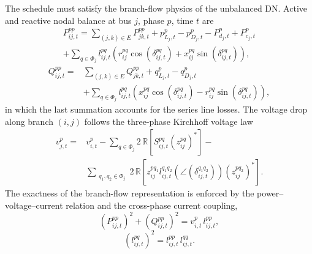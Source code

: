 The schedule must satisfy the branch-flow physics of the unbalanced DN.
Active and reactive nodal balance at bus $j$, phase $p$, time $t$ are
\begin{equation}\label{eq2}
\begin{split}
P_{ij,t}^{pp}
= \sum_{(j,k)\in E} P_{jk,t}^{pp} + p_{L_j,t}^p
- p_{D_j,t}^p - P_{d_j,t}^p + P_{c_j,t}^p \\ + \sum_{q \in \Phi_j} l_{ij,t}^{pq}
\left( r_{ij}^{pq} \cos(\delta_{ij,t}^{pq}) + x_{ij}^{pq} \sin(\delta_{ij,t}^{pq}) \right),
\end{split}
\end{equation}
\begin{equation}\label{eq3}
\begin{split}
Q_{ij,t}^{pp}
= & \sum_{(j,k)\in E} Q_{jk,t}^{pp} + q_{L_j,t}^p - q_{D_j,t}^p \\
& + \sum_{q \in \Phi_j} l_{ij,t}^{pq}
\left( x_{ij}^{pq} \cos(\delta_{ij,t}^{pq}) - r_{ij}^{pq} \sin(\delta_{ij,t}^{pq}) \right),
\end{split}
\end{equation}
in which the last summation accounts for the series line losses. The
voltage drop along branch $(i,j)$ follows the three-phase Kirchhoff
voltage law
\begin{equation}\label{eq4}
\begin{split}
v_{j,t}^p =  & v_{i,t}^p
- \sum_{q \in \Phi_j} 2\,\mathbb{R}\!\left[ S_{ij,t}^{pq} \left( z_{ij}^{pq} \right)^* \right]- \\ & \sum_{\substack{q_1, q_2 \in \Phi_j}}
2\,\mathbb{R}\!\left[ z_{ij}^{pq_1} l_{ij,t}^{q_1 q_2}
\left( \angle(\delta_{ij,t}^{q_1 q_2}) \right)
\left( z_{ij}^{pq_2} \right)^* \right].
\end{split}
\end{equation}
The exactness of the branch-flow representation is enforced by the
power--voltage--current relation and the cross-phase current coupling,
\begin{equation}\label{eq5}
\left( P_{ij,t}^{pp} \right)^2 + \left( Q_{ij,t}^{pp} \right)^2
= v_{i,t}^p \, l_{ij,t}^{pp},
\end{equation}
\begin{equation}\label{eq6}
\left( l_{ij,t}^{pq} \right)^2 = l_{ij,t}^{pp} \, l_{ij,t}^{qq}.
\end{equation}

